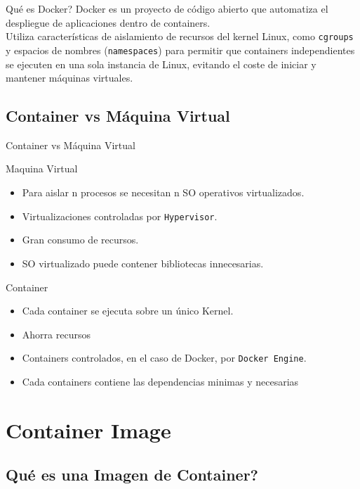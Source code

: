 \documentclass{beamer}
\begin{document}
\begin{frame}{Qué es Docker?}
	\hspace{1cm} Docker es un proyecto de código abierto que automatiza el despliegue de aplicaciones dentro de containers. \\
	\vspace{0.5cm}
	\hspace{1cm} Utiliza características de aislamiento de recursos del kernel Linux, como \texttt{cgroups} y espacios de nombres (\texttt{namespaces}) para permitir que containers independientes se ejecuten en una sola instancia de Linux, evitando el coste de iniciar y mantener máquinas virtuales.
\end{frame}

\subsection{Container vs Máquina Virtual}

\begin{frame}{Container vs Máquina Virtual}

	Maquina Virtual
	\begin{itemize}
	\item
	Para aislar n procesos se necesitan n SO operativos virtualizados.
	\item
	Virtualizaciones controladas por \texttt{Hypervisor}.
	\item 
	Gran consumo de recursos.
	\item
	SO virtualizado puede contener bibliotecas innecesarias.
	\end{itemize}		

	Container
	\begin{itemize}
	\item
	Cada container se ejecuta sobre un único Kernel.
	\item
	Ahorra recursos
	\item
	Containers controlados, en el caso de Docker, por \texttt{Docker Engine}.
	\item
	Cada containers contiene las dependencias minimas y necesarias
	\end{itemize}
\end{frame}

\section{Container Image}

\subsection{Qué es una Imagen de Container?}
\end{document}
